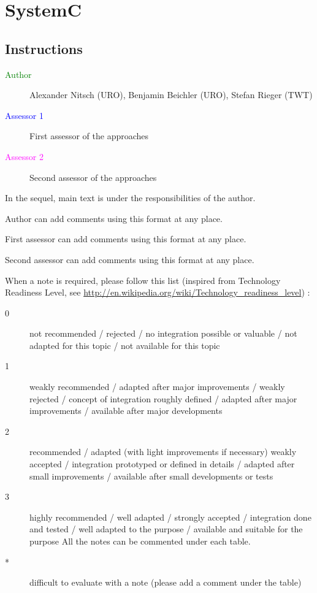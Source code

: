 \chapter{SystemC}
\label{sec:systemC}

\section{Instructions}

\begin{description}
\item[\textcolor{green}{Author}] Alexander Nitsch (URO), Benjamin Beichler (URO), Stefan Rieger (TWT)
\item[\textcolor{blue}{Assessor 1}] First assessor of the approaches 
\item[\textcolor{magenta}{Assessor 2}] Second assessor of the approaches 
\end{description}

In the sequel, main text is under the responsibilities of the author.

\begin{author_comment}
Author can add comments using this format at any place.
\end{author_comment}

\begin{assessor1}
First assessor can add comments using this format at any place.
\end{assessor1}

\begin{assessor2}
Second assessor can add comments using this format at any place.
\end{assessor2}

When a note is required, please follow this list (inspired from Technology Readiness Level, see \url{http://en.wikipedia.org/wiki/Technology\_readiness\_level}) :

\begin{description}
\item[0] not recommended / rejected / no integration possible or valuable / not adapted for this topic / not available for this topic
\item[1] weakly recommended / adapted after major improvements / weakly rejected / concept of integration roughly defined / adapted after major improvements / available after major developments
\item[2] recommended / adapted (with light improvements if necessary)  weakly accepted / integration prototyped or defined in details / adapted after small improvements / available after small developments or tests
\item[3] highly recommended / well adapted / strongly accepted / integration done and tested / well adapted to the purpose / available and suitable for the purpose All the notes can be commented under each table.
\item[*] difficult to evaluate with a note (please add a comment under the table)
\end{description}



